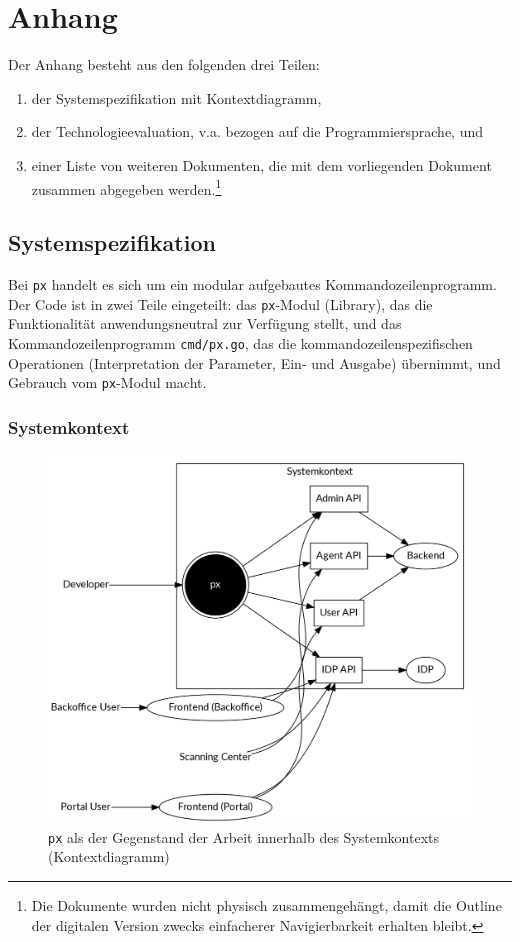 \section{Anhang}

Der Anhang besteht aus den folgenden drei Teilen:

\begin{enumerate}
    \item der Systemspezifikation mit Kontextdiagramm,
    \item der Technologieevaluation, v.a. bezogen auf die Programmiersprache, und
    \item einer Liste von weiteren Dokumenten, die mit dem vorliegenden Dokument zusammen abgegeben werden.\footnote{Die Dokumente wurden nicht physisch zusammengehängt, damit die Outline der digitalen Version zwecks einfacherer Navigierbarkeit erhalten bleibt.}
\end{enumerate}

\subsection{Systemspezifikation}

Bei \texttt{px} handelt es sich um ein modular aufgebautes Kommandozeilenprogramm. Der Code ist in zwei Teile eingeteilt: das \texttt{px}-Modul (Library), das die Funktionalität anwendungsneutral zur Verfügung stellt, und das Kommandozeilenprogramm \texttt{cmd/px.go}, das die kommandozeilenspezifischen Operationen (Interpretation der Parameter, Ein- und Ausgabe) übernimmt, und Gebrauch vom \texttt{px}-Modul macht.

\subsubsection{Systemkontext}
\label{sec:Systemkontext}

\begin{figure}
	\centering
	\includegraphics[width=\linewidth]{pics/kontextdiagramm.png}
    \caption{\texttt{px} als der Gegenstand der Arbeit innerhalb des Systemkontexts (Kontextdiagramm)}
	\label{fig:kontextdiagramm}
\end{figure}

